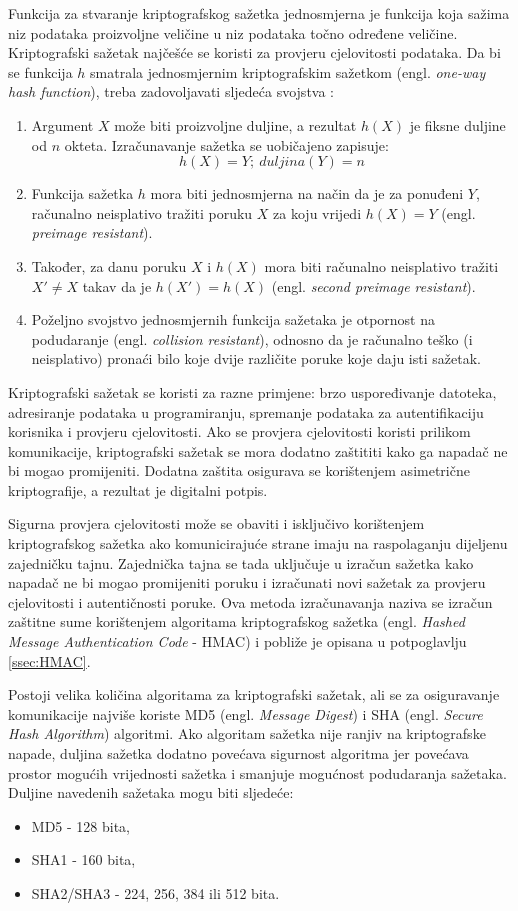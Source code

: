 Funkcija za stvaranje kriptografskog sažetka jednosmjerna je funkcija koja
sažima niz podataka
proizvoljne veličine u niz podataka točno određene veličine. Kriptografski
sažetak najčešće se koristi za provjeru cjelovitosti podataka.
Da bi se funkcija $h$ smatrala jednosmjernim kriptografskim sažetkom (engl.
\emph{one-way hash function}), treba zadovoljavati sljedeća svojstva \cite[str.
544]{van2011encyclopedia}:
\begin{enumerate}
\item Argument $X$ može biti proizvoljne duljine, a rezultat $h(X)$ je fiksne
duljine od $n$ okteta. Izračunavanje sažetka se uobičajeno zapisuje:
$$h(X) = Y;\ \mathit{duljina}(Y) = n$$
\item Funkcija sažetka $h$ mora biti jednosmjerna na način da je za ponuđeni
$Y$,
računalno neisplativo tražiti poruku $X$ za koju vrijedi $h(X)=Y$ (engl.
\emph{preimage resistant}).
\item Također, za danu poruku $X$ i $h(X)$ mora biti
računalno neisplativo tražiti $X' \neq X$ takav da je $h(X') = h(X)$ (engl.
\emph{second preimage resistant}).
\item Poželjno svojstvo jednosmjernih funkcija sažetaka je otpornost na
podudaranje (engl. \emph{collision resistant}), odnosno da je računalno
teško (i neisplativo) pronaći bilo koje dvije različite poruke koje daju isti
sažetak.
\end{enumerate}

Kriptografski sažetak se koristi za razne primjene: brzo uspoređivanje datoteka,
adresiranje podataka u programiranju, spremanje podataka za autentifikaciju
korisnika i provjeru cjelovitosti. Ako se provjera cjelovitosti koristi prilikom
komunikacije, kriptografski sažetak se mora dodatno zaštititi
kako ga napadač ne bi mogao promijeniti.
Dodatna zaštita osigurava se korištenjem asimetrične kriptografije, a rezultat
je digitalni potpis.

Sigurna provjera cjelovitosti može se obaviti i isključivo korištenjem
kriptografskog sažetka ako komunicirajuće strane imaju na raspolaganju
dijeljenu zajedničku tajnu. Zajednička tajna se tada uključuje u izračun
sažetka kako napadač ne bi mogao promijeniti poruku i izračunati novi sažetak za
provjeru cjelovitosti i autentičnosti poruke. Ova metoda izračunavanja naziva se
izračun zaštitne sume korištenjem algoritama kriptografskog sažetka (engl.
\emph{Hashed Message Authentication Code} - HMAC) i pobliže je opisana u
potpoglavlju \ref{ssec:HMAC}.

Postoji velika količina algoritama za kriptografski sažetak, ali se
za osiguravanje komunikacije najviše koriste MD5 (engl. \emph{Message Digest}) i
SHA (engl. \emph{Secure Hash Algorithm}) algoritmi.
Ako algoritam sažetka nije ranjiv na kriptografske napade, duljina
sažetka dodatno povećava sigurnost algoritma jer povećava prostor mogućih
vrijednosti
sažetka i smanjuje mogućnost podudaranja sažetaka. Duljine navedenih sažetaka
mogu biti sljedeće:
\begin{itemize}
\item MD5 - 128 bita,
\item SHA1 - 160 bita,
\item SHA2/SHA3 - 224, 256, 384 ili 512 bita.
\end{itemize}

